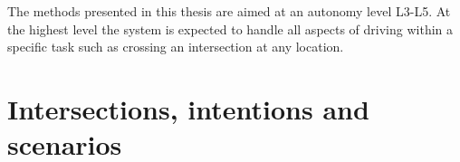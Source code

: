 
The methods presented in this thesis are aimed at an autonomy level L3-L5. At the highest level the system is expected to handle all aspects of driving within a specific task such as crossing an intersection at any location. 


\section{Intersections, intentions and scenarios}
\label{sec:intro_intersections}


